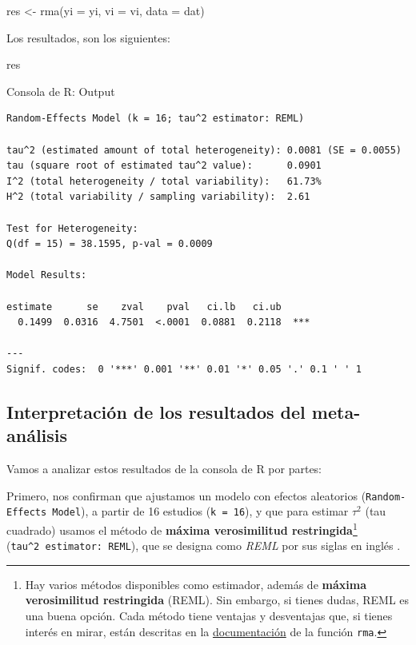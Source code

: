 \documentclass[
  bookmarksnumbered]{article}
\newenvironment{Shaded}{\begin{snugshade}}{\end{snugshade}}
\newcommand{\AttributeTok}[1]{\textcolor[rgb]{0.00,0.34,0.68}{#1}}
\newcommand{\FunctionTok}[1]{\textcolor[rgb]{0.39,0.29,0.61}{#1}}
\newcommand{\NormalTok}[1]{\textcolor[rgb]{0.12,0.11,0.11}{#1}}
\newcommand{\OtherTok}[1]{\textcolor[rgb]{0.00,0.43,0.16}{#1}}
\begin{document}
\begin{Shaded}
\begin{Highlighting}[]
\NormalTok{res }\OtherTok{\textless{}{-}} \FunctionTok{rma}\NormalTok{(}\AttributeTok{yi =}\NormalTok{ yi, }\AttributeTok{vi =}\NormalTok{ vi, }\AttributeTok{data =}\NormalTok{ dat)}
\end{Highlighting}
\end{Shaded}

Los resultados, son los siguientes:

\begin{Shaded}
\begin{Highlighting}[]
\NormalTok{res}
\end{Highlighting}
\end{Shaded}

\begin{ROut}{Consola de R: Output~\thetcbcounter}
                \begin{footnotesize}
                \begin{verbatim} 
Random-Effects Model (k = 16; tau^2 estimator: REML)

tau^2 (estimated amount of total heterogeneity): 0.0081 (SE = 0.0055)
tau (square root of estimated tau^2 value):      0.0901
I^2 (total heterogeneity / total variability):   61.73%
H^2 (total variability / sampling variability):  2.61

Test for Heterogeneity:
Q(df = 15) = 38.1595, p-val = 0.0009

Model Results:

estimate      se    zval    pval   ci.lb   ci.ub 
  0.1499  0.0316  4.7501  <.0001  0.0881  0.2118  *** 

---
Signif. codes:  0 '***' 0.001 '**' 0.01 '*' 0.05 '.' 0.1 ' ' 1
 \end{verbatim}
                \end{footnotesize}
                \end{ROut}

\hypertarget{meta-interp}{%
\subsection{Interpretación de los resultados del meta-análisis}\label{meta-interp}}

Vamos a analizar estos resultados de la consola de R por partes:

Primero, nos confirman que ajustamos un modelo con efectos aleatorios (\texttt{Random-Effects\ Model}), a partir de 16 estudios (\texttt{k\ =\ 16}), y que para estimar \(\tau^2\) (tau cuadrado) usamos el método de \textbf{máxima verosimilitud restringida}\footnote{Hay varios métodos disponibles como estimador, además de \textbf{máxima verosimilitud restringida} (REML). Sin embargo, si tienes dudas, REML es una buena opción. Cada método tiene ventajas y desventajas que, si tienes interés en mirar, están descritas en la \href{https://www.rdocumentation.org/packages/metafor/versions/2.4-0/topics/rma.uni}{documentación} de la función \texttt{rma}.} (\texttt{tau\^{}2\ estimator:\ REML}), que se designa como \emph{REML} por sus siglas en inglés .
\end{document}
